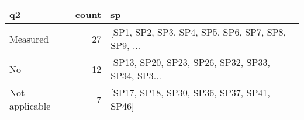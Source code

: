\begin{tabular}{lrl}
\toprule
             q2 &  count &                                                 sp \\
\midrule
       Measured &     27 &  [SP1, SP2, SP3, SP4, SP5, SP6, SP7, SP8, SP9, ... \\
             No &     12 &  [SP13, SP20, SP23, SP26, SP32, SP33, SP34, SP3... \\
 Not applicable &      7 &         [SP17, SP18, SP30, SP36, SP37, SP41, SP46] \\
\bottomrule
\end{tabular}

